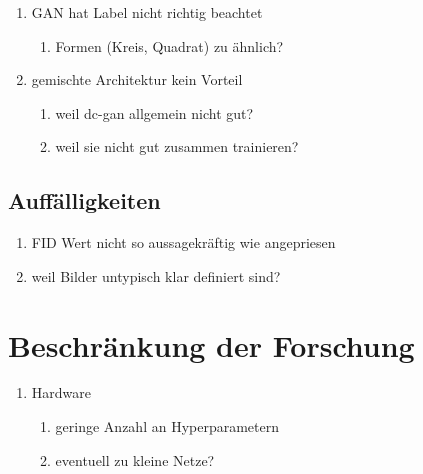 \begin{enumerate}
	\item GAN hat Label nicht richtig beachtet
	\begin{enumerate}
		\item Formen (Kreis, Quadrat) zu ähnlich?
	\end{enumerate}

	\item gemischte Architektur kein Vorteil
	\begin{enumerate}
		\item weil dc-gan allgemein nicht gut?
		\item weil sie nicht gut zusammen trainieren?
	\end{enumerate}
\end{enumerate}

\subsection{Auffälligkeiten}
\begin{enumerate}
	\item FID Wert nicht so aussagekräftig wie angepriesen
	\item weil Bilder untypisch klar definiert sind?
\end{enumerate}

\section{Beschränkung der Forschung}

\begin{enumerate}
	\item Hardware
	\begin{enumerate}
		\item geringe Anzahl an Hyperparametern
		\item eventuell zu kleine Netze?
	\end{enumerate}
\end{enumerate}

